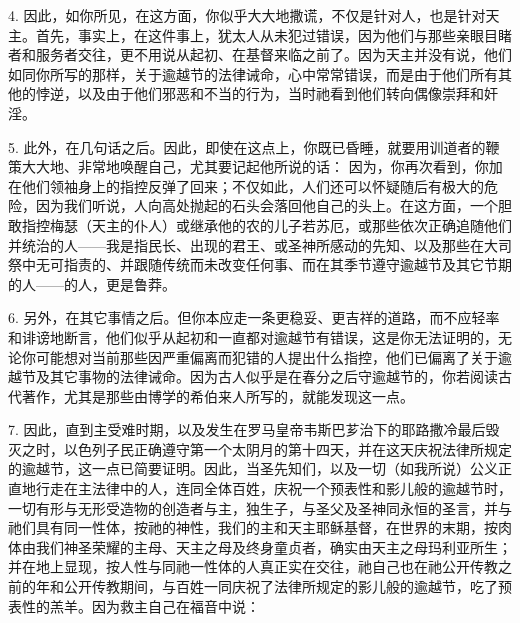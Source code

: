 4. 因此，如你所见，在这方面，你似乎大大地撒谎，不仅是针对人，也是针对天主。首先，事实上，在这件事上，犹太人从未犯过错误，因为他们与那些亲眼目睹者和服务者交往，更不用说从起初、在基督来临之前了。因为天主并没有说，他们如同你所写的那样，关于逾越节的法律诫命，心中常常错误，而是由于他们所有其他的悖逆，以及由于他们邪恶和不当的行为，当时祂看到他们转向偶像崇拜和奸淫。\par

5. 此外，在几句话之后。因此，即使在这点上，你既已昏睡，就要用训道者的鞭策大大地、非常地唤醒自己，尤其要记起他所说的话：  因为，你再次看到，你加在他们领袖身上的指控反弹了回来；不仅如此，人们还可以怀疑随后有极大的危险，因为我们听说，人向高处抛起的石头会落回他自己的头上。在这方面，一个胆敢指控梅瑟（天主的仆人）或继承他的农的儿子若苏厄，或那些依次正确追随他们并统治的人——我是指民长、出现的君王、或圣神所感动的先知、以及那些在大司祭中无可指责的、并跟随传统而未改变任何事、而在其季节遵守逾越节及其它节期的人——的人，更是鲁莽。\par

6. 另外，在其它事情之后。但你本应走一条更稳妥、更吉祥的道路，而不应轻率和诽谤地断言，他们似乎从起初和一直都对逾越节有错误，这是你无法证明的，无论你可能想对当前那些因严重偏离而犯错的人提出什么指控，他们已偏离了关于逾越节及其它事物的法律诫命。因为古人似乎是在春分之后守逾越节的，你若阅读古代著作，尤其是那些由博学的希伯来人所写的，就能发现这一点。\par

7. 因此，直到主受难时期，以及发生在罗马皇帝韦斯巴芗治下的耶路撒冷最后毁灭之时，以色列子民正确遵守第一个太阴月的第十四天，并在这天庆祝法律所规定的逾越节，这一点已简要证明。因此，当圣先知们，以及一切（如我所说）公义正直地行走在主法律中的人，连同全体百姓，庆祝一个预表性和影儿般的逾越节时，一切有形与无形受造物的创造者与主，独生子，与圣父及圣神同永恒的圣言，并与祂们具有同一性体，按祂的神性，我们的主和天主耶稣基督，在世界的末期，按肉体由我们神圣荣耀的主母、天主之母及终身童贞者，确实由天主之母玛利亚所生；并在地上显现，按人性与同祂一性体的人真正实在交往，祂自己也在祂公开传教之前的年和公开传教期间，与百姓一同庆祝了法律所规定的影儿般的逾越节，吃了预表性的羔羊。因为救主自己在福音中说：\par

